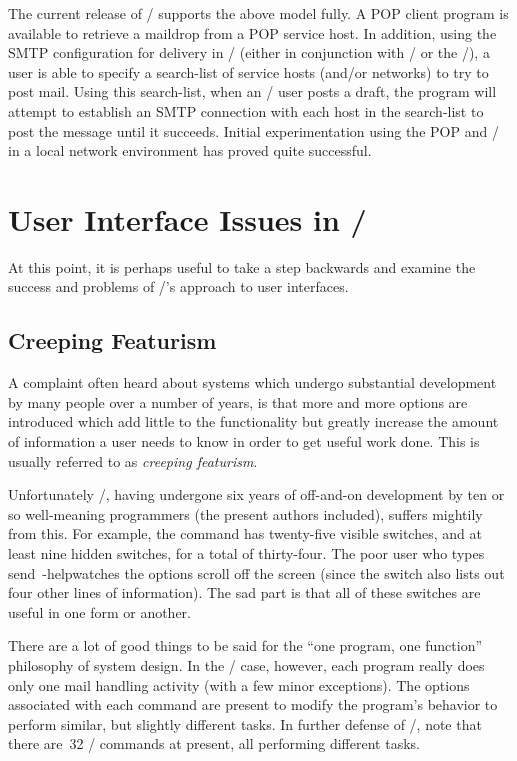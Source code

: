 The current release of \MH/ supports the above model fully.
A POP client program is available to retrieve a maildrop from a POP service
host.
In addition,
using the SMTP configuration for delivery in \MH/
(either in conjunction with \SendMail/ or the \MMDF/),
a user is able to specify a search-list of service hosts (and/or networks)
to try to post mail.
Using this search-list,
when an \MH/ user posts a draft,
the  program will attempt to establish an SMTP connection
with each host in the search-list to post the message until it succeeds.
Initial experimentation using the POP and \MH/
in a local network environment has proved quite successful.

\section{User Interface Issues in \MH/}		%
At this point,
it is perhaps useful to take a step backwards and examine the success
and problems of \MH/'s approach to user interfaces.

\subsection{Creeping Featurism}			%
A complaint often heard about systems which undergo substantial development
by many people over a number of years, is that more and more options are
introduced which add little to the functionality but greatly increase the
amount of information a user needs to know in order to get useful work done.
This is usually referred to as {\it creeping featurism}.

Unfortunately \MH/,
having undergone six years of off-and-on development by ten or so
well-meaning programmers (the present authors included),
suffers mightily from this.
For example,
the  command has twenty-five visible switches,
and at least nine hidden switches,
for a total of thirty-four.
The poor user who types \example send\ -help\endexample watches the options
scroll off the screen
(since the  switch also lists out four other lines of
information).%
The sad part is that all of these switches are useful in one form or another.

There are a lot of good things to be said for the
``one program, one function'' philosophy of system design.
In the \MH/ case, however,
each program really does only one mail handling activity
(with a few minor exceptions).
The options associated with each command are present to modify the program's
behavior to perform similar, but slightly different tasks.
In further defense of \MH/,
note that there are~32 \MH/ commands at present,
all performing different tasks.

